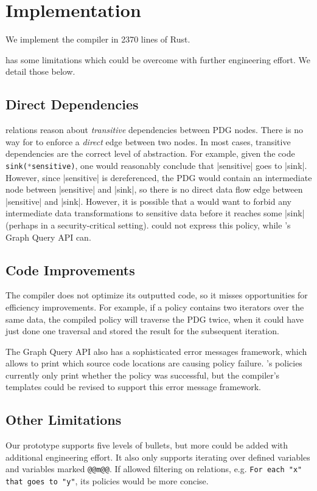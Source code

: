 \chapter{Implementation}

We implement the \syslang{} compiler in 2370 lines of Rust.

\syslang{} has some limitations which could be overcome with further engineering effort.
%
We detail those below.

\section{Direct Dependencies}
\label{sec:direct-limits}
\syslang{} relations reason about \emph{transitive} dependencies between PDG nodes.
%
There is no way for \ces{} to enforce a \emph{direct} edge between two nodes.
%
In most cases, transitive dependencies are the correct level of abstraction.
%
For example, given the code \lstinline[language=Rust]|sink(*sensitive)|,
one would reasonably conclude that |sensitive| goes to |sink|.
%
However, since |sensitive| is dereferenced, the PDG would contain an intermediate node between |sensitive| and |sink|,
so there is no direct data flow edge between |sensitive| and |sink|.
%
However, it is possible that a \dev{} would want to forbid any intermediate data transformations
to sensitive data before it reaches some |sink| (perhaps in a security-critical setting).
%
\syslang{} could not express this policy, while \sys{}'s Graph Query API can.

\section{Code Improvements}
\label{sec:code-limits}
The \syslang{} compiler does not optimize its outputted code, so it misses opportunities for efficiency improvements.
%
For example, if a policy contains two iterators over the same data, the \syslang{} compiled policy will traverse the PDG twice,
when it could have just done one traversal and stored the result for the subsequent iteration.

The Graph Query API also has a sophisticated error messages framework,
which allows \devs{} to print which source code locations are causing policy failure.
%
\syslang{}'s policies currently only print whether the policy was successful,
but the compiler's templates could be revised to support this error message framework.
%

\section{Other Limitations}
\label{sec:other-limits}
Our \syslang{} prototype supports five levels of bullets, but more could be added with additional engineering effort.
%
It also only supports iterating over defined variables and variables marked \lstinline[language=CNL]|@@m@@|.
%
If \syslang{} allowed filtering on relations, e.g. \lstinline[language=CNL]|For each "x" that goes to "y"|,
its policies would be more concise.
